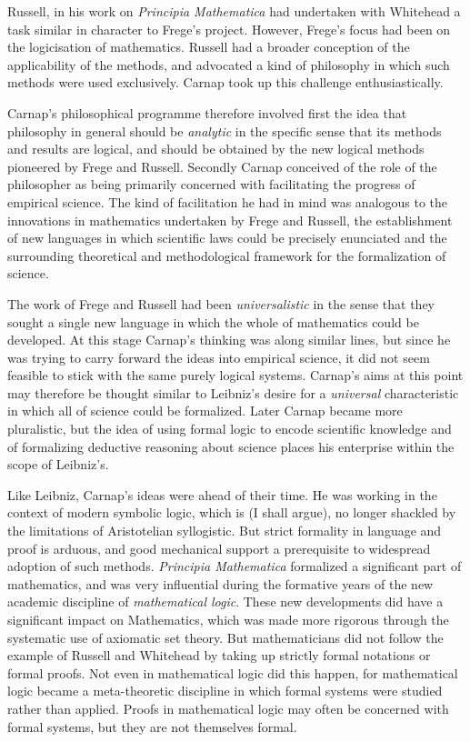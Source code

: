 Russell, in his work on \emph{Principia Mathematica} had undertaken
with Whitehead a task similar in character to Frege's project. 
However, Frege's focus had been on the logicisation of mathematics.
Russell had a broader conception of the applicability of the methods,
and advocated a kind of philosophy in which such methods were used
exclusively. 
Carnap took up this challenge enthusiastically.

Carnap's philosophical programme therefore involved first the idea
that philosophy in general should be \emph{analytic} in the specific
sense that its methods and results are logical, and should be obtained
by the new logical methods pioneered by Frege and Russell. 
Secondly Carnap conceived of the role of the philosopher as being
primarily concerned with facilitating the progress of empirical
science. 
The kind of facilitation he had in mind was analogous to the
innovations in mathematics undertaken by Frege and Russell, the
establishment of new languages in which scientific laws could be
precisely enunciated and the surrounding theoretical and
methodological framework for the formalization of science. 

The work of Frege and Russell had been \emph{universalistic} in the
sense that they sought a single new language in which the whole of
mathematics could be developed. 
At this stage Carnap's thinking was along similar lines, but since he
was trying to carry forward the ideas into empirical science, it did
not seem feasible to stick with the same purely logical systems. 
Carnap's aims at this point may therefore be thought similar to
Leibniz's desire for a \emph{universal} characteristic in which all of
science could be formalized. 
Later Carnap became more pluralistic, but the idea of using formal
logic to encode scientific knowledge and of formalizing deductive
reasoning about science places his enterprise within the scope of
Leibniz's. 

Like Leibniz, Carnap's ideas were ahead of their time.
He was working in the context of modern symbolic logic, which is (I
shall argue), no longer shackled by the limitations of Aristotelian
syllogistic. 
But strict formality in language and proof is arduous, and good
mechanical support a prerequisite to widespread adoption of such
methods. 
\emph{Principia Mathematica} formalized a significant part of
mathematics, and was very influential during the formative years of
the new academic discipline of \emph{mathematical logic}. 
These new developments did have a significant impact on Mathematics,
which was made more rigorous through the systematic use of axiomatic
set theory. 
But mathematicians did not follow the example of Russell and Whitehead
by taking up strictly formal notations or formal proofs. 
Not even in mathematical logic did this happen, for mathematical logic
became a meta-theoretic discipline in which formal systems were
studied rather than applied. 
Proofs in mathematical logic may often be concerned with formal
systems, but they are not themselves formal. 

